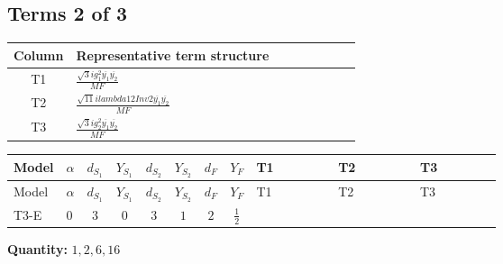 \documentclass[8pt]{article}
\begin{document}
\begin{landscape}
\subsection*{Terms 2 of 3}
\begin{center}
\begin{tabular}{@{}c >{\raggedright\arraybackslash}p{0.82\linewidth}@{}}
\toprule
Column & Representative term structure \\
\midrule
T1 & \(\displaystyle \frac{\sqrt{3} i g_{1}^{2} \overline{y_{1}} \overline{y_{2}}}{MF}\) \\
\midrule
T2 & \(\displaystyle \frac{\sqrt{11} i lambda12Inv2 \overline{y_{1}} \overline{y_{2}}}{MF}\) \\
\midrule
T3 & \(\displaystyle \frac{\sqrt{3} i g_{2}^{2} \overline{y_{1}} \overline{y_{2}}}{MF}\) \\
\midrule
\bottomrule
\end{tabular}
\end{center}
\smallskip
\tiny
\begin{longtable}{@{}llcccccc >{\raggedright\arraybackslash}p{0.21\linewidth} >{\raggedright\arraybackslash}p{0.21\linewidth} >{\raggedright\arraybackslash}p{0.21\linewidth}@{}}
\toprule
Model & $\alpha$ & $d_{S_1}$ & $Y_{S_1}$ & $d_{S_2}$ & $Y_{S_2}$ & $d_F$ & $Y_F$ & T1 & T2 & T3 \\
\midrule
\endfirsthead
\toprule
Model & $\alpha$ & $d_{S_1}$ & $Y_{S_1}$ & $d_{S_2}$ & $Y_{S_2}$ & $d_F$ & $Y_F$ & T1 & T2 & T3 \\
\midrule
\endhead
T3-E & $0$ & $3$ & $0$ & $3$ & $1$ & $2$ & $\frac{1}{2}$ & \scriptsize\adjustbox{max width=\linewidth}{$\begin{gathered} \frac{\sqrt{3} i g_{1}^{2} \overline{y_{1}} \overline{y_{2}}}{8 MF}\end{gathered}$} & \scriptsize\adjustbox{max width=\linewidth}{$\begin{gathered} \frac{3 \sqrt{11} i lambda12Inv2 \overline{y_{1}} \overline{y_{2}}}{22 MF}\end{gathered}$} & \scriptsize\adjustbox{max width=\linewidth}{$\begin{gathered} \frac{15 \sqrt{3} i g_{2}^{2} \overline{y_{1}} \overline{y_{2}}}{8 MF}\end{gathered}$} \\
\midrule
\bottomrule
\end{longtable}
\clearpage
\noindent\textbf{Quantity: }$\mathrm{1,2,6,16}$\par\smallskip

\end{landscape}
\end{document}
